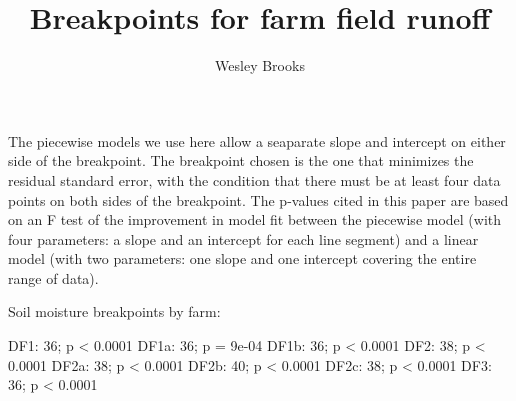 \documentclass[12pt]{article}
\title{Breakpoints for farm field runoff}
\author{Wesley Brooks}
\date{}                                           %
\begin{document}
\maketitle








The piecewise models we use here allow a seaparate slope and intercept on either side of the breakpoint. The breakpoint chosen is the one that minimizes the residual standard error, with the condition that there must be at least four data points on both sides of the breakpoint. The p-values cited in this paper are based on an F test of the improvement in model fit between the piecewise model (with four parameters: a slope and an intercept for each line segment) and a linear model (with two parameters: one slope and one intercept covering the entire range of data).

\begin{Schunk}
\begin{Soutput}
Soil moisture breakpoints by farm:
\end{Soutput}
\begin{Soutput}
DF1: 36; p < 0.0001
DF1a: 36; p = 9e-04
DF1b: 36; p < 0.0001
DF2: 38; p < 0.0001
DF2a: 38; p < 0.0001
DF2b: 40; p < 0.0001
DF2c: 38; p < 0.0001
DF3: 36; p < 0.0001
\end{Soutput}
\end{Schunk}
\end{document}
